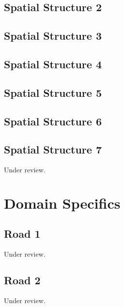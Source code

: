\documentclass{scrartcl}
\begin{document}
\subsection{Spatial Structure 2}
\label{sec:spatial_2}
\clearpage

\subsection{Spatial Structure 3}
\label{sec:spatial_3}
\clearpage

\subsection{Spatial Structure 4}
\label{sec:spatial_4}
\clearpage

\subsection{Spatial Structure 5}
\label{sec:spatial_5}
\clearpage

\subsection{Spatial Structure 6}
\label{sec:spatial_6}
\clearpage

\subsection{Spatial Structure 7}
\label{sec:spatial_7}
Under review.%
\clearpage

\section{Domain Specifics}

\subsection{Road 1}
\label{sec:road_1}
Under review.%
\clearpage

\subsection{Road 2}
\label{sec:road_2}
Under review.%
\clearpage
\end{document}
